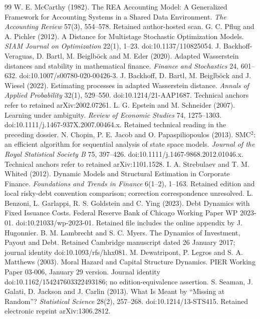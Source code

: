 \documentclass[11pt,a4paper]{article}
\begin{document}
\begingroup
\raggedright
\begin{thebibliography}{99}
 W. E. McCarthy (1982). The REA Accounting Model: A Generalized Framework for Accounting Systems in a Shared Data Environment. \emph{The Accounting Review} 57(3), 554--578. Retained author-hosted scan.
 G. C. Pflug and A. Pichler (2012). A Distance for Multistage Stochastic Optimization Models. \emph{SIAM Journal on Optimization} 22(1), 1--23. doi:10.1137/110825054.
 J. Backhoff-Veraguas, D. Bartl, M. Beiglböck and M. Eder (2020). Adapted Wasserstein distances and stability in mathematical finance. \emph{Finance and Stochastics} 24, 601--632. doi:10.1007/s00780-020-00426-3.
 J. Backhoff, D. Bartl, M. Beiglböck and J. Wiesel (2022). Estimating processes in adapted Wasserstein distance. \emph{Annals of Applied Probability} 32(1), 529--550. doi:10.1214/21-AAP1687. Technical anchors refer to retained arXiv:2002.07261.
 L. G. Epstein and M. Schneider (2007). Learning under ambiguity. \emph{Review of Economic Studies} 74, 1275--1303. doi:10.1111/j.1467-937X.2007.00464.x. Retained technical reading in the preceding dossier.
 N. Chopin, P. E. Jacob and O. Papaspiliopoulos (2013). SMC$^2$: an efficient algorithm for sequential analysis of state space models. \emph{Journal of the Royal Statistical Society B} 75, 397--426. doi:10.1111/j.1467-9868.2012.01046.x. Technical anchors refer to retained arXiv:1101.1528.
 I. A. Strebulaev and T. M. Whited (2012). Dynamic Models and Structural Estimation in Corporate Finance. \emph{Foundations and Trends in Finance} 6(1--2), 1--163. Retained edition and local risky-debt convention comparison; correction correspondence unresolved.
 L. Benzoni, L. Garlappi, R. S. Goldstein and C. Ying (2023). Debt Dynamics with Fixed Issuance Costs. Federal Reserve Bank of Chicago Working Paper WP 2023-01. doi:10.21033/wp-2023-01. Retained file includes the online appendix by J. Hugonnier.
 B. M. Lambrecht and S. C. Myers. The Dynamics of Investment, Payout and Debt. Retained Cambridge manuscript dated 26 January 2017; journal identity doi:10.1093/rfs/hhx081.
 M. Dewatripont, P. Legros and S. A. Matthews (2003). Moral Hazard and Capital Structure Dynamics. PIER Working Paper 03-006, January 29 version. Journal identity doi:10.1162/154247603322493186; no edition-equivalence assertion.
 S. Seaman, J. Galati, D. Jackson and J. Carlin (2013). What Is Meant by ``Missing at Random''? \emph{Statistical Science} 28(2), 257--268. doi:10.1214/13-STS415. Retained electronic reprint arXiv:1306.2812.

\end{thebibliography}
\end{document}
